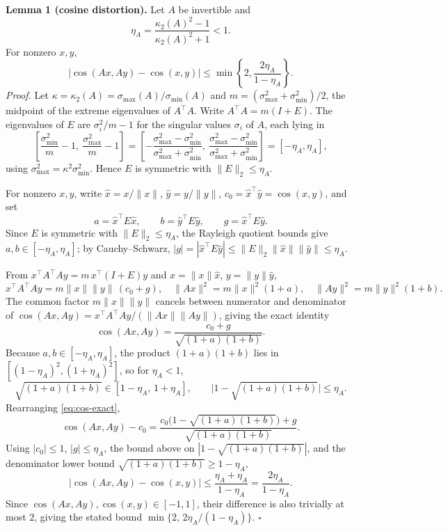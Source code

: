 \documentclass[11pt,a4paper]{article}
\begin{document}
\textbf{Lemma 1 (cosine distortion).} Let $A$ be invertible and
\begin{equation}
\eta_A=\frac{\kappa_2(A)^2-1}{\kappa_2(A)^2+1}<1.
\end{equation}
For nonzero $x,y$,
\begin{equation}
|\cos(Ax,Ay)-\cos(x,y)|
\le \min\!\left\{2,\frac{2\eta_A}{1-\eta_A}\right\}.
\label{eq:cos-bound}
\end{equation}
\emph{Proof.} Let $\kappa=\kappa_2(A)=\sigma_{\max}(A)/\sigma_{\min}(A)$ and
$m=(\sigma_{\max}^2+\sigma_{\min}^2)/2$, the midpoint of the extreme
eigenvalues of $A^\top A$. Write $A^\top A = m(I+E)$. The eigenvalues of $E$
are $\sigma_i^2/m-1$ for the singular values $\sigma_i$ of $A$, each lying in
\[
\left[\frac{\sigma_{\min}^2}{m}-1,\ \frac{\sigma_{\max}^2}{m}-1\right]
=\left[-\frac{\sigma_{\max}^2-\sigma_{\min}^2}{\sigma_{\max}^2+\sigma_{\min}^2},\
\frac{\sigma_{\max}^2-\sigma_{\min}^2}{\sigma_{\max}^2+\sigma_{\min}^2}\right]
=[-\eta_A,\eta_A],
\]
using $\sigma_{\max}^2=\kappa^2\sigma_{\min}^2$. Hence $E$ is symmetric with
$\|E\|_2\le\eta_A$.

For nonzero $x,y$, write $\hat x=x/\|x\|$, $\hat y=y/\|y\|$,
$c_0=\hat x^\top\hat y=\cos(x,y)$, and set
\begin{equation}
a=\hat x^\top E\hat x,\qquad b=\hat y^\top E\hat y,\qquad g=\hat x^\top E\hat y.
\end{equation}
Since $E$ is symmetric with $\|E\|_2\le\eta_A$, the Rayleigh quotient bounds
give $a,b\in[-\eta_A,\eta_A]$; by Cauchy--Schwarz,
$|g|=|\hat x^\top E\hat y|\le\|E\|_2\|\hat x\|\|\hat y\|\le\eta_A$.

From $x^\top A^\top Ay=m\,x^\top(I+E)y$ and $x=\|x\|\hat x$, $y=\|y\|\hat y$,
\[
x^\top A^\top A y = m\|x\|\|y\|\,(c_0+g),\quad
\|Ax\|^2=m\|x\|^2(1+a),\quad
\|Ay\|^2=m\|y\|^2(1+b).
\]
The common factor $m\|x\|\|y\|$ cancels between numerator and denominator of
$\cos(Ax,Ay)=x^\top A^\top Ay/(\|Ax\|\|Ay\|)$, giving the exact identity
\begin{equation}
\cos(Ax,Ay)=\frac{c_0+g}{\sqrt{(1+a)(1+b)}}.
\label{eq:cos-exact}
\end{equation}
Because $a,b\in[-\eta_A,\eta_A]$, the product $(1+a)(1+b)$ lies in
$[(1-\eta_A)^2,(1+\eta_A)^2]$, so for $\eta_A<1$,
\[
\sqrt{(1+a)(1+b)}\in[1-\eta_A,\,1+\eta_A],
\qquad
\big|1-\sqrt{(1+a)(1+b)}\big|\le\eta_A.
\]
Rearranging \eqref{eq:cos-exact},
\[
\cos(Ax,Ay)-c_0
=\frac{c_0\big(1-\sqrt{(1+a)(1+b)}\big)+g}{\sqrt{(1+a)(1+b)}}.
\]
Using $|c_0|\le1$, $|g|\le\eta_A$, the bound above on
$|1-\sqrt{(1+a)(1+b)}|$, and the denominator lower bound
$\sqrt{(1+a)(1+b)}\ge1-\eta_A$,
\[
\big|\cos(Ax,Ay)-\cos(x,y)\big|
\le\frac{\eta_A+\eta_A}{1-\eta_A}
=\frac{2\eta_A}{1-\eta_A}.
\]
Since $\cos(Ax,Ay),\cos(x,y)\in[-1,1]$, their difference is also trivially
at most $2$, giving the stated bound
$\min\{2,\,2\eta_A/(1-\eta_A)\}$. \hfill$\square$
\end{document}
